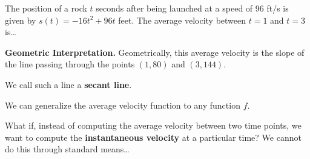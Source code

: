 \documentclass[12pt]{article}
\begin{document}
\Example The position of a rock $t$ seconds after being launched at a speed of 96 ft/s is given by $s(t)=-16t^2+96t$ feet. The average velocity between $t=1$ and $t=3$ is\dots

\newpage 

\textbf{Geometric Interpretation.} Geometrically, this average velocity is the slope of the line passing through the points $(1,80)$ and $(3,144)$.

\begin{center}
        \end{center}

We call such a line a \textbf{secant line}.

\vspace{5mm}

We can generalize the average velocity function to any function $f$. 

\vspace{5mm}


\vspace{5mm}

What if, instead of computing the average velocity between two time points, we want to compute the \textbf{instantaneous velocity} at a particular time? We cannot do this through standard means\dots

\vspace{10mm}
\end{document}
